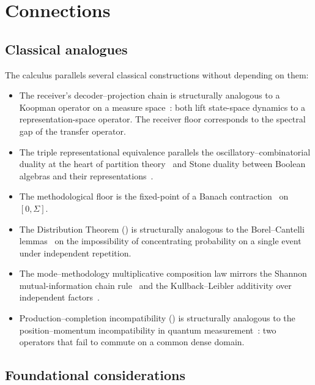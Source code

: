 \documentclass[twocolumn,11pt,a4paper]{article}
\begin{document}
\section{Connections}
\label{sec:connections}

\subsection{Classical analogues}

The calculus parallels several classical constructions without depending
on them:
\begin{itemize}[leftmargin=*]
\item The receiver's decoder--projection chain is structurally analogous
to a Koopman operator on a measure space~\cite{koopman1931}: both lift
state-space dynamics to a representation-space operator. The receiver
floor corresponds to the spectral gap of the transfer operator.
\item The triple representational equivalence parallels the
oscillatory--combinatorial duality at the heart of partition
theory~\cite{andrews1976} and Stone duality between Boolean algebras and
their representations~\cite{stone1936}.
\item The methodological floor is the fixed-point of a Banach
contraction~\cite{banach1922} on $[0,\Sigma]$.
\item The Distribution Theorem () is structurally
analogous to the Borel--Cantelli lemmas~\cite{borel1909,cantelli1917} on
the impossibility of concentrating probability on a single event under
independent repetition.
\item The mode--methodology multiplicative composition law mirrors the
Shannon mutual-information chain rule~\cite{shannon1948,coverthomas2006}
and the Kullback--Leibler additivity over independent
factors~\cite{kullback1951}.
\item Production--completion incompatibility () is
structurally analogous to the position--momentum incompatibility in
quantum measurement~\cite{vonneumann1932}: two operators that fail to
commute on a common dense domain.
\end{itemize}

\subsection{Foundational considerations}
\end{document}
